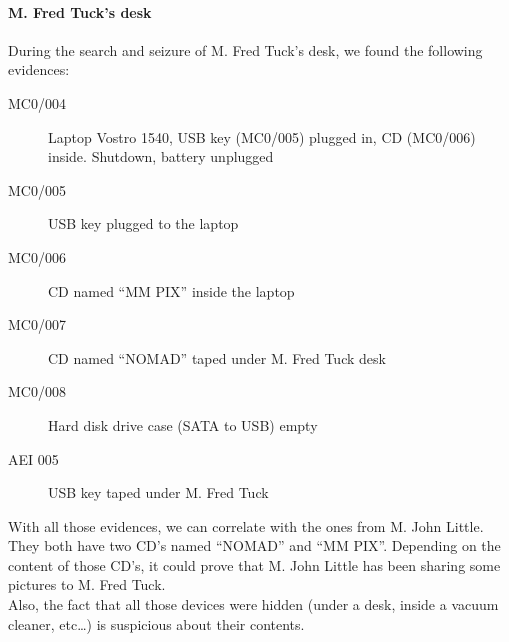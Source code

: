 \paragraph{M. Fred Tuck's desk}
During the search and seizure of M. Fred Tuck's desk, we found the following evidences:
\begin{description}
 \item[MC0/004] Laptop Vostro 1540, USB key (MC0/005) plugged in, CD (MC0/006) inside. Shutdown, battery unplugged
 \item[MC0/005] USB key plugged to the laptop
 \item[MC0/006] CD named \enquote{MM PIX} inside the laptop
 \item[MC0/007] CD named \enquote{NOMAD} taped under M. Fred Tuck desk
 \item[MC0/008] Hard disk drive case (SATA to USB) empty
 \item[AEI 005] USB key taped under M. Fred Tuck
\end{description}
With all those evidences, we can correlate with the ones from M. John Little. They both have two CD's named \enquote{NOMAD} and \enquote{MM PIX}. Depending on the content of those CD's, it could prove that M. John Little has been sharing some pictures to M. Fred Tuck.\\
Also, the fact that all those devices were hidden (under a desk, inside a vacuum cleaner, etc\ldots) is suspicious about their contents.

